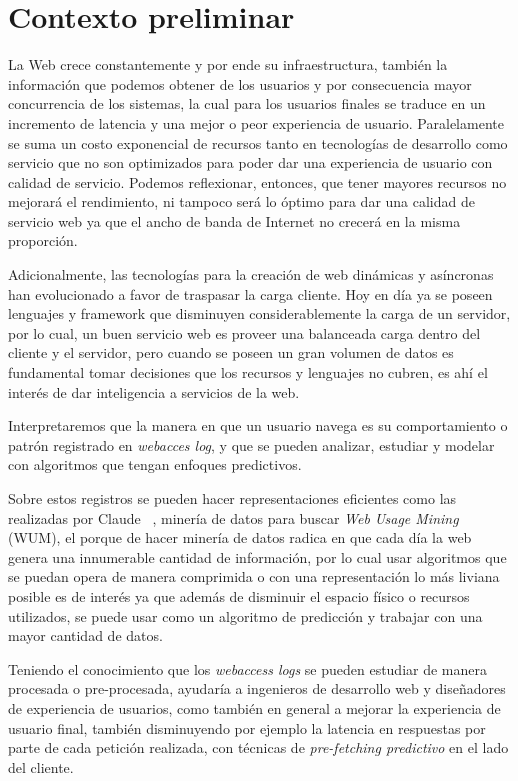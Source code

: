 \section{Contexto preliminar} 
\label{sec:preliminar}


  La Web crece constantemente y por ende su infraestructura, también la información que podemos obtener de los  usuarios y  por consecuencia mayor concurrencia de los sistemas, la cual para los usuarios finales se traduce en un incremento de latencia y una mejor o peor experiencia de usuario. Paralelamente se suma un costo exponencial de recursos tanto en tecnologías de desarrollo como servicio que no son optimizados para poder dar una experiencia de usuario con calidad de servicio. Podemos reflexionar, entonces, que tener mayores recursos no mejorará el rendimiento, ni tampoco será lo óptimo para dar una calidad de servicio web ya que el ancho de banda de Internet no crecerá en la misma proporción.
   
  Adicionalmente, las tecnologías para la creación de web dinámicas y asíncronas han evolucionado a favor de traspasar la carga cliente.
  Hoy en día ya se poseen lenguajes y {framework} que disminuyen considerablemente la carga de un servidor, por lo cual, un buen servicio web es proveer una balanceada carga dentro del cliente y el servidor, pero cuando se poseen un gran volumen de datos es fundamental tomar decisiones que los recursos y lenguajes no cubren, es ahí el interés de dar inteligencia a servicios de la web.

  Interpretaremos que la manera en que un usuario navega es su comportamiento o patrón registrado en \emph{webacces log}, y que se pueden analizar, estudiar y modelar con algoritmos que tengan enfoques predictivos. 

  Sobre estos registros se pueden hacer representaciones eficientes como las realizadas por Claude \etal~\cite{Claude2014},  minería de datos para buscar \emph{Web Usage Mining} (WUM), el porque de hacer minería de datos radica en que cada día la web genera una innumerable cantidad de información, por lo cual usar algoritmos que se puedan opera de manera comprimida o con una representación lo más liviana posible es de interés ya que además de disminuir el espacio físico o recursos utilizados, se puede usar como un algoritmo de predicción y trabajar con una mayor cantidad de datos.
  
  Teniendo el conocimiento que los \emph{webaccess logs} se pueden estudiar de manera procesada o pre-procesada, ayudaría a ingenieros de desarrollo web y diseñadores de experiencia de usuarios, como también en general a mejorar la experiencia de usuario final, también disminuyendo por ejemplo la latencia en respuestas por parte de cada petición realizada, con técnicas de \emph{pre-fetching predictivo} en el lado del cliente.
  

